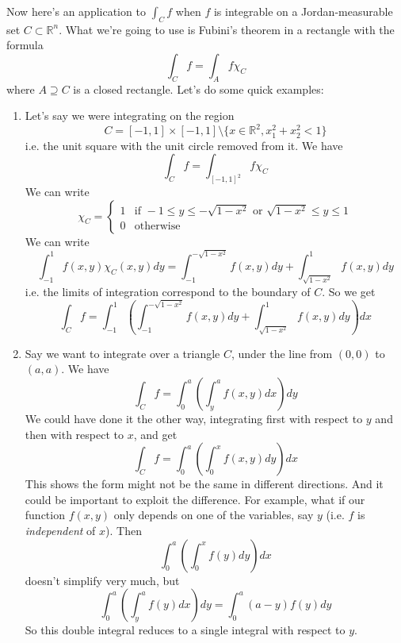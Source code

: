 \documentclass{article}
\newcommand{\reals}[0]{\mathbb{R}}
\newcommand{\indic}[1]{\chi_{#1}}
\begin{document}
Now here's an application to \(\int_Cf\) when \(f\) is integrable on a Jordan-measurable set \(C \subset \reals^n\). What we're going to use is Fubini's theorem in a rectangle with the formula
\begin{equation}\int_Cf = \int_Af\indic{C}\end{equation}
where \(A \supseteq C\) is a closed rectangle.
Let's do some quick examples:
\begin{enumerate}

\item Let's say we were integrating on the region
\begin{equation}C = [-1, 1] \times [-1, 1] \setminus \{x \in \reals^2, x_1^2 + x_2^2 < 1\}\end{equation}
i.e. the unit square with the unit circle removed from it. We have
\begin{equation}\int_Cf = \int_{[-1, 1]^2}f\indic{C}\end{equation}
We can write
\begin{equation}\indic{C} = \left\{\begin{array}{cc}
  1 & \text{if } -1 \leq y \leq -\sqrt{1 - x^2} \text{ or } \sqrt{1 - x^2} \leq y \leq 1 \\
  0 & \text{otherwise}
\end{array}\right.\end{equation}
We can write
\begin{equation}\int_{-1}^1f(x, y)\indic{C}(x, y)dy = \int_{-1}^{-\sqrt{1 - x^2}}f(x, y)dy + \int_{\sqrt{1 - x^2}}^1f(x, y)dy\end{equation}
i.e. the limits of integration correspond to the boundary of \(C\). So we get
\begin{equation}\int_Cf = \int_{-1}^1\left(\int_{-1}^{-\sqrt{1 - x^2}}f(x, y)dy + \int_{\sqrt{1 - x^2}}^1f(x, y)dy\right)dx\end{equation}

\item Say we want to integrate over a triangle \(C\), under the line from \((0, 0)\) to \((a, a)\). We have
\begin{equation}\int_Cf = \int_0^a\left(\int_y^af(x, y)dx\right)dy\end{equation}
We could have done it the other way, integrating first with respect to \(y\) and then with respect to \(x\), and get
\begin{equation}\int_Cf = \int_0^a\left(\int_0^xf(x, y)dy\right)dx\end{equation}
This shows the form might not be the same in different directions. And it could be important to exploit the difference. For example, what if our function \(f(x, y)\) only depends on one of the variables, say \(y\) (i.e. \(f\) is \textit{independent} of \(x\)). Then
\begin{equation}\int_0^a\left(\int_0^xf(y)dy\right)dx\end{equation}
doesn't simplify very much, but
\begin{equation}\int_0^a\left(\int_y^af(y)dx\right)dy = \int_0^a(a - y)f(y)dy\end{equation}
So this double integral reduces to a single integral with respect to \(y\).


\end{enumerate}
\end{document}
